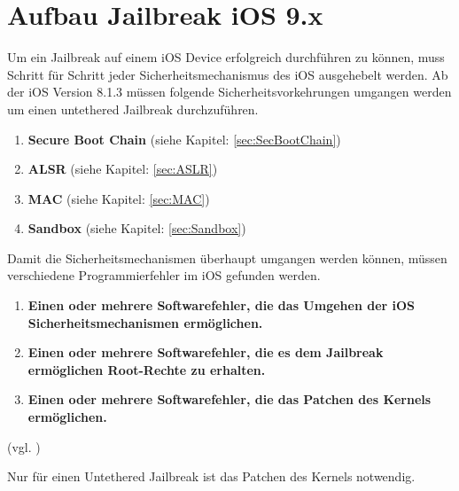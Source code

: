 \section{Aufbau Jailbreak iOS 9.x}
\label{sec:JBAufbau}
Um ein Jailbreak auf einem iOS Device erfolgreich durchführen zu können, muss Schritt für Schritt jeder Sicherheitsmechanismus des iOS ausgehebelt werden. Ab der iOS Version 8.1.3 müssen folgende Sicherheitsvorkehrungen umgangen werden um einen untethered Jailbreak durchzuführen.

\begin{enumerate}
	    \item \textbf{Secure Boot Chain} (siehe Kapitel: \ref{sec:SecBootChain})
	    \item \textbf{ALSR }(siehe Kapitel: \ref{sec:ASLR})
	    \item \textbf{MAC} (siehe Kapitel: \ref{sec:MAC})
	   \item \textbf{Sandbox} (siehe Kapitel: \ref{sec:Sandbox}) 
\end{enumerate}

Damit die Sicherheitsmechanismen überhaupt umgangen werden können, müssen verschiedene Programmierfehler im iOS gefunden werden. 
\begin{enumerate}
  \item \textbf{Einen oder mehrere Softwarefehler, die das Umgehen der iOS Sicherheitsmechanismen ermöglichen.}
  \item \textbf{Einen oder mehrere Softwarefehler, die es dem Jailbreak ermöglichen Root-Rechte zu erhalten.}
  \item \textbf{Einen oder mehrere Softwarefehler, die das Patchen des Kernels ermöglichen.}
\end{enumerate}
(vgl. \cite{TaiG[1], TaiG[2], TaiG[3]})

Nur für einen Untethered Jailbreak ist das Patchen des Kernels notwendig.



